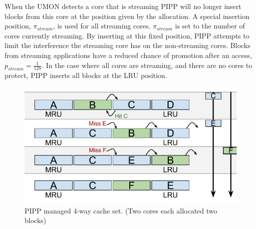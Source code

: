 When the UMON detects a core that is streaming PIPP will no longer insert blocks from this core at the position given by the allocation.
A special insertion position, $\pi_{stream}$, is used for all streaming cores.
$\pi_{stream}$ is set to the number of cores currently streaming. 
By inserting at this fixed position, PIPP attempts to limit the interference the streaming core has on the non-streaming cores.
Blocks from streaming applications have a reduced chance of promotion after an access, $p_{stream} = \frac{1}{128}$.
In the case where all cores are streaming, and there are no cores to protect, PIPP inserts all blocks at the LRU position.

\begin{figure}[ht]
    \centering
    \includegraphics[width=.65\textwidth]{figures/algorithms/PIPP}
    \caption[PIPP managed 4-way cache set.]{PIPP managed 4-way cache set. (Two cores each allocated two blocks)}
    \label{fig:algorithms:pipp_example}
\end{figure}